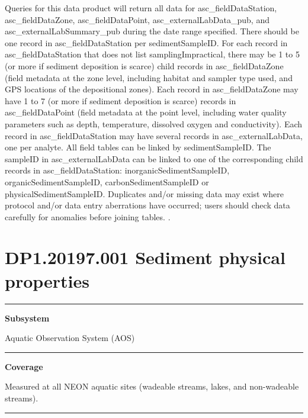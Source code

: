 \documentclass[]{article}
\begin{document}
Queries for this data product will return all data for
asc\_fieldDataStation, asc\_fieldDataZone, asc\_fieldDataPoint,
asc\_externalLabData\_pub, and asc\_externalLabSummary\_pub during the
date range specified. There should be one record in
asc\_fieldDataStation per sedimentSampleID. For each record in
asc\_fieldDataStation that does not list samplingImpractical, there may
be 1 to 5 (or more if sediment deposition is scarce) child records in
asc\_fieldDataZone (field metadata at the zone level, including habitat
and sampler type used, and GPS locations of the depositional zones).
Each record in asc\_fieldDataZone may have 1 to 7 (or more if sediment
deposition is scarce) records in asc\_fieldDataPoint (field metadata at
the point level, including water quality parameters such as depth,
temperature, dissolved oxygen and conductivity). Each record in
asc\_fieldDataStation may have several records in asc\_externalLabData,
one per analyte. All field tables can be linked by sedimentSampleID. The
sampleID in asc\_externalLabData can be linked to one of the
corresponding child records in asc\_fieldDataStation:
inorganicSedimentSampleID, organicSedimentSampleID,
carbonSedimentSampleID or physicalSedimentSampleID. Duplicates and/or
missing data may exist where protocol and/or data entry aberrations have
occurred; users should check data carefully for anomalies before joining
tables. \newpage
.

\section{DP1.20197.001 Sediment physical
properties}\label{dp1.20197.001-sediment-physical-properties}

\begin{center}\rule{0.5\linewidth}{\linethickness}\end{center}

\textbf{Subsystem}

Aquatic Observation System (AOS)

\begin{center}\rule{0.5\linewidth}{\linethickness}\end{center}

\textbf{Coverage}

Measured at all NEON aquatic sites (wadeable streams, lakes, and
non-wadeable streams).

\begin{center}\rule{0.5\linewidth}{\linethickness}\end{center}
\end{document}
